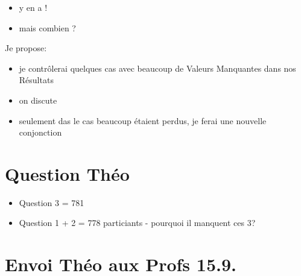 \documentclass[
]{article}
\providecommand{\tightlist}{%
  \setlength{\itemsep}{0pt}\setlength{\parskip}{0pt}}
\begin{document}
\begin{itemize}
\tightlist
\item
  y en a !
\item
  mais combien ?
\end{itemize}

Je propose:

\begin{itemize}
\tightlist
\item
  je contrôlerai quelques cas avec beaucoup de Valeurs Manquantes dans
  nos Résultats
\item
  on discute
\item
  seulement das le cas beaucoup étaient perdus, je ferai une nouvelle
  conjonction
\end{itemize}

\hypertarget{question-thuxe9o}{%
\section{Question Théo}\label{question-thuxe9o}}

\begin{itemize}
\tightlist
\item
  Question 3 = 781
\item
  Question 1 + 2 = 778 particiants - pourquoi il manquent ces 3?
\end{itemize}

\hypertarget{envoi-thuxe9o-aux-profs-15.9.}{%
\section{Envoi Théo aux Profs
15.9.}\label{envoi-thuxe9o-aux-profs-15.9.}}
\end{document}
